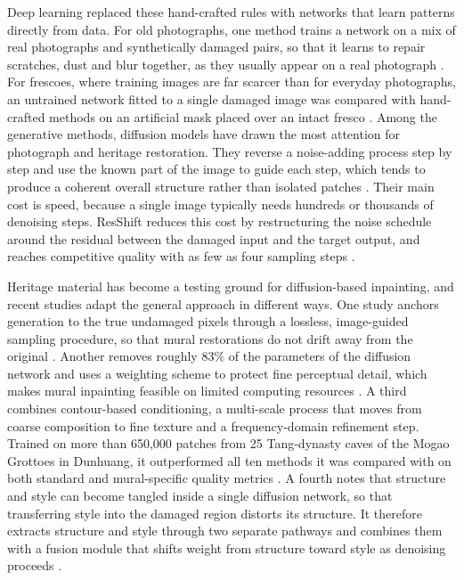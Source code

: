 \documentclass[conference]{IEEEtran}
\begin{document}
Deep learning replaced these hand-crafted rules with networks that learn patterns directly from data. For old photographs, one method trains a network on a mix of real photographs and synthetically damaged pairs, so that it learns to repair scratches, dust and blur together, as they usually appear on a real photograph \cite{wan2023}. For frescoes, where training images are far scarcer than for everyday photographs, an untrained network fitted to a single damaged image was compared with hand-crafted methods on an artificial mask placed over an intact fresco \cite{merizzi2024}. Among the generative methods, diffusion models have drawn the most attention for photograph and heritage restoration. They reverse a noise-adding process step by step and use the known part of the image to guide each step, which tends to produce a coherent overall structure rather than isolated patches \cite{wang2026}. Their main cost is speed, because a single image typically needs hundreds or thousands of denoising steps. ResShift reduces this cost by restructuring the noise schedule around the residual between the damaged input and the target output, and reaches competitive quality with as few as four sampling steps \cite{yue2025}.

Heritage material has become a testing ground for diffusion-based inpainting, and recent studies adapt the general approach in different ways. One study anchors generation to the true undamaged pixels through a lossless, image-guided sampling procedure, so that mural restorations do not drift away from the original \cite{hu2025guidepaint}. Another removes roughly 83\% of the parameters of the diffusion network and uses a weighting scheme to protect fine perceptual detail, which makes mural inpainting feasible on limited computing resources \cite{zhao2026apldiff}. A third combines contour-based conditioning, a multi-scale process that moves from coarse composition to fine texture and a frequency-domain refinement step. Trained on more than 650{,}000 patches from 25 Tang-dynasty caves of the Mogao Grottoes in Dunhuang, it outperformed all ten methods it was compared with on both standard and mural-specific quality metrics \cite{han2026diffumural}. A fourth notes that structure and style can become tangled inside a single diffusion network, so that transferring style into the damaged region distorts its structure. It therefore extracts structure and style through two separate pathways and combines them with a fusion module that shifts weight from structure toward style as denoising proceeds \cite{peng2026dcadif}.
\end{document}
